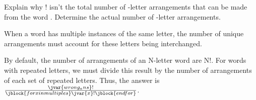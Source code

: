     Explain why ! isn't the total number of -letter arrangements that can be made from the word . Determine the actual number of -letter arrangements.

    When a word has multiple instances of the same letter, the number of unique arrangements must account for these letters being interchanged.

    By default, the number of arrangements of an N-letter word are N!. For words with repeated letters, we must divide this result by the number of arrangements of each set of repeated letters.
    Thus, the answer is $\frac{\jvar{wrong_ans}!}{\jblock{for x in multiples} \jvar{x}! \jblock{endfor}}$.
